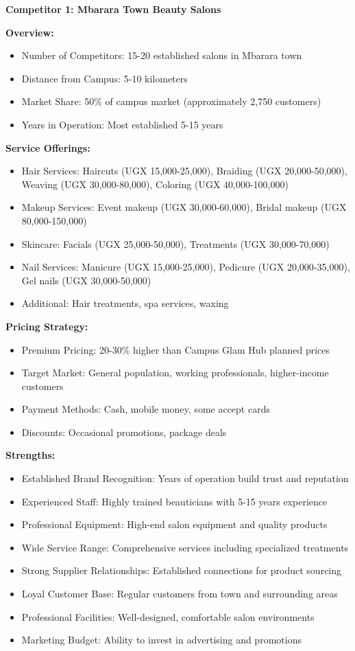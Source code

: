\textbf{Competitor 1: Mbarara Town Beauty Salons}

\textbf{Overview:}
\begin{itemize}[leftmargin=2em]
    \item Number of Competitors: 15-20 established salons in Mbarara town
    \item Distance from Campus: 5-10 kilometers
    \item Market Share: 50\% of campus market (approximately 2,750 customers)
    \item Years in Operation: Most established 5-15 years
\end{itemize}

\textbf{Service Offerings:}
\begin{itemize}[leftmargin=2em]
    \item Hair Services: Haircuts (UGX 15,000-25,000), Braiding (UGX 20,000-50,000), Weaving (UGX 30,000-80,000), Coloring (UGX 40,000-100,000)
    \item Makeup Services: Event makeup (UGX 30,000-60,000), Bridal makeup (UGX 80,000-150,000)
    \item Skincare: Facials (UGX 25,000-50,000), Treatments (UGX 30,000-70,000)
    \item Nail Services: Manicure (UGX 15,000-25,000), Pedicure (UGX 20,000-35,000), Gel nails (UGX 30,000-50,000)
    \item Additional: Hair treatments, spa services, waxing
\end{itemize}

\textbf{Pricing Strategy:}
\begin{itemize}[leftmargin=2em]
    \item Premium Pricing: 20-30\% higher than Campus Glam Hub planned prices
    \item Target Market: General population, working professionals, higher-income customers
    \item Payment Methods: Cash, mobile money, some accept cards
    \item Discounts: Occasional promotions, package deals
\end{itemize}

\textbf{Strengths:}
\begin{itemize}[leftmargin=2em]
    \item Established Brand Recognition: Years of operation build trust and reputation
    \item Experienced Staff: Highly trained beauticians with 5-15 years experience
    \item Professional Equipment: High-end salon equipment and quality products
    \item Wide Service Range: Comprehensive services including specialized treatments
    \item Strong Supplier Relationships: Established connections for product sourcing
    \item Loyal Customer Base: Regular customers from town and surrounding areas
    \item Professional Facilities: Well-designed, comfortable salon environments
    \item Marketing Budget: Ability to invest in advertising and promotions
\end{itemize}

